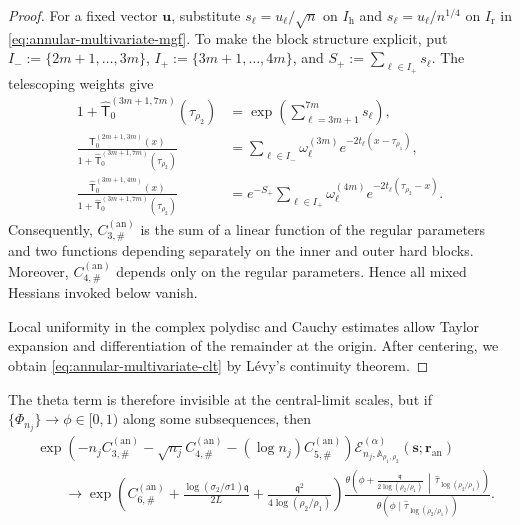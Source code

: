 \documentclass[a4paper]{article}
\numberwithin{equation}{section}
\begin{document}
\begin{proof}
For a fixed vector $\boldsymbol u$, substitute
$s_\ell=u_\ell/\sqrt n$ on $I_{\mathrm h}$ and
$s_\ell=u_\ell/n^{1/4}$ on $I_{\mathrm r}$ in
\eqref{eq:annular-multivariate-mgf}.  To make the block structure explicit,
put $I_-:=\{2m+1,\ldots,3m\}$,
$I_+:=\{3m+1,\ldots,4m\}$, and
$S_+:=\sum_{\ell\in I_+}s_\ell$.  The telescoping weights give
\begin{align*}
1+\widehat{\mathsf T}_0^{(3m+1,7m)}(\tau_{\rho_2})
&=\exp\!\left(\sum_{\ell=3m+1}^{7m}s_\ell\right),\\
\frac{\mathsf T_0^{(2m+1,3m)}(x)}
{1+\widehat{\mathsf T}_0^{(3m+1,7m)}(\tau_{\rho_2})}
&=\sum_{\ell\in I_-}\omega_\ell^{(3m)}
e^{-2t_\ell(x-\tau_{\rho_1})},\\
\frac{\widehat{\mathsf T}_0^{(3m+1,4m)}(x)}
{1+\widehat{\mathsf T}_0^{(3m+1,7m)}(\tau_{\rho_2})}
&=e^{-S_+}\sum_{\ell\in I_+}\omega_\ell^{(4m)}
e^{-2t_\ell(\tau_{\rho_2}-x)}.
\end{align*}
Consequently,
$C_{3,\#}^{(\mathrm{an})}$ is the sum of a linear function of the regular
parameters and two functions depending separately on the inner and outer
hard blocks.  Moreover, $C_{4,\#}^{(\mathrm{an})}$ depends only on the
regular parameters.  Hence all mixed Hessians invoked below vanish.

Local uniformity in the complex polydisc and Cauchy estimates allow Taylor
expansion and differentiation of the remainder at the origin.  After centering,
we obtain \eqref{eq:annular-multivariate-clt} by L\'evy’s continuity theorem.
\end{proof}

The theta term is therefore invisible at the central-limit scales, but if
$\{\Phi_{n_j}\}\to\phi\in[0,1)$ along some subsequences, then
\begin{align}
&\exp\!\left(
-n_jC_{3,\#}^{(\mathrm{an})}
-\sqrt{n_j}C_{4,\#}^{(\mathrm{an})}
-(\log n_j)C_{5,\#}^{(\mathrm{an})}
\right)
\mathcal E_{n_j,\mathbb A_{\rho_1,\rho_2}}^{(\alpha)}
(\boldsymbol s;\boldsymbol r_{\mathrm{an}})
\nonumber\\
&\qquad\longrightarrow
\exp\!\left(
C_{6,\#}^{(\mathrm{an})}
+\frac{\log(\sigma_2/\sigma1)\mathfrak q}{2L}+\frac{\mathfrak q^2}{4\log(\rho_2/\rho_1)}
\right)
\frac{\theta\!\left(\phi+\frac{\mathfrak q}{2\log(\rho_2/\rho_1)}
\,\middle|\,\widehat \tau_{\log(\rho_2/\rho_1)}\right)}
{\theta(\phi\mid \widehat \tau_{\log(\rho_2/\rho_1)})}.
\label{eq:annular-fixed-parameter-mod-theta}
\end{align}
\end{document}
